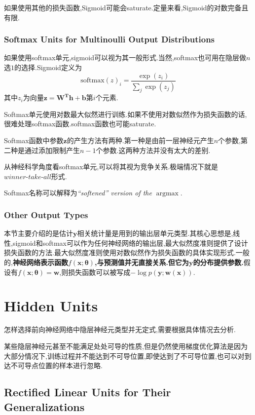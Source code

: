如果使用其他的损失函数,Sigmoid可能会saturate.定量来看,Sigmoid的对数完备且有限.

\subsubsection{Softmax Units for Multinoulli Output Distributions}

如果使用softmax单元,sigmoid可以视为其一般形式.当然,softmax也可用在隐层做$n$选$1$的选择.Sigmoid定义为
\begin{equation}
\text{softmax}(z)_i=\frac{\exp(z_i)}{\sum_j\exp(z_j)}
\end{equation}
其中$z_i$为向量$\bm{z=W^Th+b}$第$i$个元素.

Softmax单元使用对数最大似然进行训练.如果不使用对数似然作为损失函数的话,很难处理softmax函数.softmax函数也可能saturate.

Softmax函数中参数$\bm z$的产生方法有两种.第一种是由前一层神经元产生$n$个参数,第二种是通过添加限制产生$n-1$个参数.这两种方法并没有太大的差别.

从神经科学角度看softmax单元,可以将其视为竞争关系.极端情况下就是$\textit{winner-take-all}$形式.

Softmax名称可以解释为\textit{``softened'' version of the} $\mathop{\arg\max}$.

\subsubsection{Other Output Types}

本节主要介绍的是估计$\bm y$相关统计量是用到的输出层单元类型.其核心思想是,线性,sigmoid和softmax可以作为任何神经网络的输出层,最大似然度准则提供了设计损失函数的方法.最大似然度准则使用对数似然作为损失函数的具体实现形式.一般的,\textbf{神经网络表示函数$f(\bm x;{\bm\theta})$,与预测值并无直接关系.但它为$\bm y$的分布提供参数.}假设有$f(\bm x;{\bm\theta})=\bm w$,则损失函数可以被写成$-\log p(\bm y;\bm{w(x)})$.

\section{Hidden Units}

怎样选择前向神经网络中隐层神经元类型并无定式,需要根据具体情况去分析.

某些隐层神经元甚至不能满足处处可导的性质,但是仍然使用梯度优化算法是因为大部分情况下,训练过程并不能达到不可导位置,即使达到了不可导位置,也可以对到达不可导点位置的样本进行忽略.

\subsection{Rectified Linear Units for Their Generalizations}

